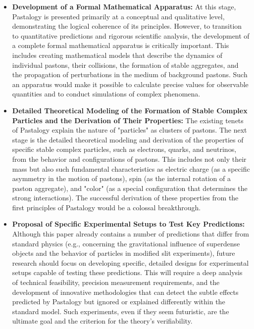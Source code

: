 \documentclass[pdflatex,sn-mathphys-num]{sn-jnl}
\begin{document}
\begin{itemize}
    \item \textbf{Development of a Formal Mathematical Apparatus:} At this stage, Pastalogy is presented primarily at a conceptual and qualitative level, demonstrating the logical coherence of its principles. However, to transition to quantitative predictions and rigorous scientific analysis, the development of a complete formal mathematical apparatus is critically important. This includes creating mathematical models that describe the dynamics of individual pastons, their collisions, the formation of stable aggregates, and the propagation of perturbations in the medium of background pastons. Such an apparatus would make it possible to calculate precise values for observable quantities and to conduct simulations of complex phenomena.
    
    \item \textbf{Detailed Theoretical Modeling of the Formation of Stable Complex Particles and the Derivation of Their Properties:} The existing tenets of Pastalogy explain the nature of "particles" as clusters of pastons. The next stage is the detailed theoretical modeling and derivation of the properties of specific stable complex particles, such as electrons, quarks, and neutrinos, from the behavior and configurations of pastons. This includes not only their mass but also such fundamental characteristics as electric charge (as a specific asymmetry in the motion of pastons), spin (as the internal rotation of a paston aggregate), and "color" (as a special configuration that determines the strong interactions). The successful derivation of these properties from the first principles of Pastalogy would be a colossal breakthrough.
    
    \item \textbf{Proposal of Specific Experimental Setups to Test Key Predictions:} Although this paper already contains a number of predictions that differ from standard physics (e.g., concerning the gravitational influence of superdense objects and the behavior of particles in modified slit experiments), future research should focus on developing specific, detailed designs for experimental setups capable of testing these predictions. This will require a deep analysis of technical feasibility, precision measurement requirements, and the development of innovative methodologies that can detect the subtle effects predicted by Pastalogy but ignored or explained differently within the standard model. Such experiments, even if they seem futuristic, are the ultimate goal and the criterion for the theory's verifiability.
\end{itemize}
\end{document}
